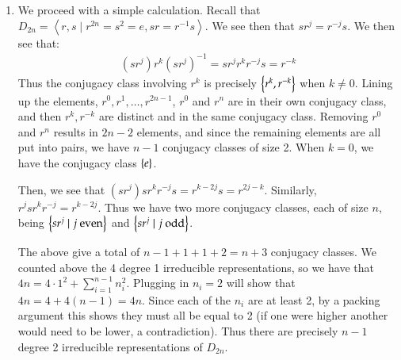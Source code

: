 \documentclass[12pt]{article}
\theoremstyle{definitionstyle}
\newcommand{\SET}[1]{\Set{\mskip-\medmuskip #1 \mskip-\medmuskip}}
\newcommand{\gen}[1]{\left\langle #1 \right\rangle}
\begin{document}
\begin{enumerate}
        \item We proceed with a simple calculation. Recall that $D_{2n} = \gen{r, s \mid r^{2n} = s^2 = e, sr=r^{-1}s}$. We see then that $sr^j = r^{-j}s$. We then see that:
        \begin{align*}
            (sr^j)r^k(sr^j)^{-1} = sr^jr^kr^{-j}s = r^{-k}
        \end{align*}
        Thus the conjugacy class involving $r^k$ is precisely $\SET{r^k, r^{-k}}$ when $k \neq 0$. Lining up the elements, $r^0, r^1, \ldots, r^{2n-1}$, $r^0$ and $r^{n}$ are in their own conjugacy class, and then $r^k, r^{-k}$ are distinct and in the same conjugacy class. Removing $r^0$ and $r^{n}$ results in $2n-2$ elements, and since the remaining elements are all put into pairs, we have $n-1$ conjugacy classes of size 2. When $k = 0$, we have the conjugacy class $\SET{e}$. 
        
        Then, we see that
        $(sr^j)sr^kr^{-j}s = r^{k-2j}s = r^{2j-k}$. Similarly, $r^jsr^kr^{-j} = r^{k-2j}$. Thus we have two more conjugacy classes, each of size $n$, being $\SET{sr^j \mid j \text{ even}}$ and $\SET{sr^j \mid j \text{ odd}}$. 

        The above give a total of $n-1+1+1+2 = n+3$ conjugacy classes. We counted above the 4 degree 1 irreducible representations, so we have that $4n = 4 \cdot 1^2 + \sum_{i=1}^{n-1} n_i^2$. Plugging in $n_i = 2$ will show that $4n = 4 + 4(n-1) = 4n$. Since each of the $n_i$ are at least 2, by a packing argument this shows they must all be equal to 2 (if one were higher another would need to be lower, a contradiction). Thus there are precisely $n-1$ degree 2 irreducible representations of $D_{2n}$.
    \end{enumerate}
\end{document}
